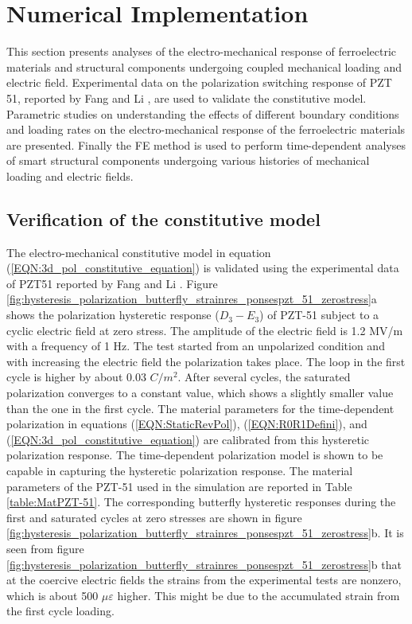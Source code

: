 \section{Numerical Implementation}
This section presents analyses of the electro-mechanical response of ferroelectric materials and structural components undergoing coupled mechanical loading and electric field. 
Experimental data on the polarization switching response of PZT 51, reported by Fang and Li \cite{Li2004959}, are used to validate the constitutive model. 
Parametric studies on understanding the effects of different boundary conditions and loading rates on the electro-mechanical response of the ferroelectric materials are presented. 
Finally the FE method is used to perform time-dependent analyses of smart structural components undergoing various histories of mechanical loading and electric fields.

\subsection{Verification of the constitutive model} 
The electro-mechanical constitutive model in equation (\ref{EQN:3d_pol_constitutive_equation}) is validated using the experimental data of PZT51 reported by Fang and Li \cite{Li2004959}. 
Figure \ref{fig:hysteresis_polarization_butterfly_strainres_ponsespzt_51_zerostress}a shows the polarization hysteretic response ($D_3-E_3$) of PZT-51 subject to a cyclic electric field at zero stress. 
The amplitude of the electric field is 1.2 MV/m with a frequency of 1 Hz. 
The test started from an unpolarized condition and with increasing the electric field the polarization takes place. 
The loop in the first cycle is higher by about 0.03 $C/m^2$. 
After several cycles, the saturated polarization converges to a constant value, which shows a slightly smaller value than the one in the first cycle. 
The material parameters for the time-dependent polarization in equations (\ref{EQN:StaticRevPol}), (\ref{EQN:R0R1Defini}), and (\ref{EQN:3d_pol_constitutive_equation}) are calibrated from this hysteretic polarization response. 
The time-dependent polarization model is shown to be capable in capturing the hysteretic polarization response. 
The material parameters of the PZT-51 used in the simulation are reported in Table \ref{table:MatPZT-51}. 
The corresponding butterfly hysteretic responses during the first and saturated cycles at zero stresses are shown in figure \ref{fig:hysteresis_polarization_butterfly_strainres_ponsespzt_51_zerostress}b. 
It is seen from figure \ref{fig:hysteresis_polarization_butterfly_strainres_ponsespzt_51_zerostress}b that at the coercive electric fields the strains from the experimental tests are nonzero, which is about 500 $\mu \varepsilon$ higher. 
This might be due to the accumulated strain from the first cycle loading. 

